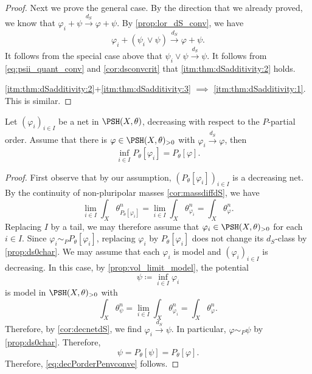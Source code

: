 \begin{proof}
Next we prove the general case. By the direction that we already proved, we know that $\varphi_i+\psi\xrightarrow{d_{S}} \varphi+\psi$. By \cref{prop:lor_dS_conv}, we have
\[
\varphi_i+(\psi_i\lor \psi)\xrightarrow{d_{S}} \varphi+\psi.
\]
It follows from the special case above that $\psi_i\lor \psi\xrightarrow{d_{S}}\psi$. It follows from \eqref{eq:psii_quant_conv} and \cref{cor:dsconvcrit} that \ref{itm:thm:dSadditivity:2} holds.

\ref{itm:thm:dSadditivity:2}+\ref{itm:thm:dSadditivity:3} $\implies$ \ref{itm:thm:dSadditivity:1}. This is similar.

\end{proof}

\begin{proposition}\label{prop:decPorderPenvconve}
    Let $(\varphi_i)_{i\in I}$ be a net in $\PSH(X,\theta)$, decreasing with respect to the $P$-partial order. Assume that there is $\varphi\in \PSH(X,\theta)_{>0}$ with $\varphi_i\xrightarrow{d_S}\varphi$, then
    \begin{equation}\label{eq:decPorderPenvconve}
        \inf_{i\in I} P_{\theta}[\varphi_i]=P_{\theta}[\varphi].
    \end{equation}
\end{proposition}
\begin{proof}
    First observe that by our assumption, $(P_{\theta}[\varphi_i])_{i\in I}$ is a decreasing net. By the continuity of non-pluripolar masses \cref{cor:massdiffdS}, we have
    \[
        \lim_{i\in I} \int_X \theta_{P_{\theta}[\varphi_i]}^n=\lim_{i\in I} \int_X \theta_{\varphi_i}^n= \int_X \theta_{\varphi}^n.
    \]
    Replacing $I$ by a tail, we may therefore assume that $\varphi_i\in \PSH(X,\theta)_{>0}$ for each $i\in I$.
    Since $\varphi_i\sim_P P_\theta[\varphi_i]$, replacing $\varphi_i$ by $P_\theta[\varphi_i]$ does not change its $d_S$-class by \cref{prop:ds0char}. We may assume that each $\varphi_i$ is model and $(\varphi_i)_{i\in I}$ is decreasing. In this case, by \cref{prop:vol_limit_model}, the potential
    \[
        \psi\coloneqq \inf_{i\in I} \varphi_i
    \]
    is model in $\PSH(X,\theta)_{>0}$ with
    \[
        \int_X \theta_{\psi}^n=\lim_{i\in I} \int_X \theta_{\varphi_i}^n= \int_X \theta_{\varphi}^n.
    \]
    Therefore, by \cref{cor:decnetdS}, we find $\varphi_i\xrightarrow{d_S}\psi$. In particular, $\varphi\sim_P \psi$ by \cref{prop:ds0char}. Therefore,
    \[
        \psi=P_{\theta}[\psi]=P_{\theta}[\varphi].
    \]
    Therefore, \eqref{eq:decPorderPenvconve} follows.
\end{proof}




